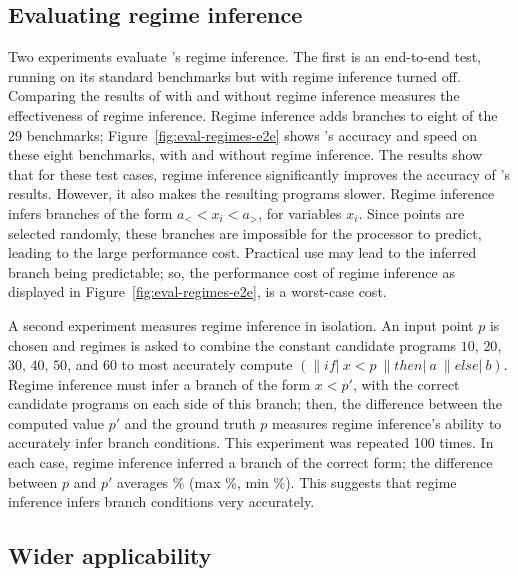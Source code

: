 \documentclass[paper.tex]{subfiles}
\begin{document}
\subsection{Evaluating regime inference} \label{sec:eval-regimes}

Two experiments evaluate \casio's regime inference.
The first is an end-to-end test,
  running \casio on its standard benchmarks but with regime inference turned off.
Comparing the results of \casio with and without regime inference
  measures the effectiveness of regime inference.
Regime inference adds branches to eight of the 29 benchmarks;
  Figure~\ref{fig:eval-regimes-e2e} shows
  \casio's accuracy and speed on these eight benchmarks,
  with and without regime inference.
The results show that for these test cases, regime inference
  significantly improves the accuracy of \casio's results.
However, it also makes the resulting programs slower.
Regime inference infers branches of the form $a_< < x_i < a_>$,
  for variables $x_i$.
Since points are selected randomly, these branches are
  impossible for the processor to predict,
  leading to the large performance cost.
Practical use may lead to the inferred branch being predictable;
  so, the performance cost of regime inference
  as displayed in Figure~\ref{fig:eval-regimes-e2e},
  is a worst-case cost.

A second experiment measures regime inference in isolation.
An input point $p$ is chosen
  and regimes is asked to combine the constant candidate programs
  $10$, $20$, $30$, $40$, $50$, and $60$
  to most accurately compute $(\|if|\:x < p\:\|then|\:a\:\|else|\:b)$.
Regime inference must infer a branch of the form $x < p'$,
  with the correct candidate programs on each side of this branch;
  then, the difference between the computed value $p'$ and the ground truth $p$
  measures regime inference's ability to accurately infer branch conditions.
This experiment was repeated 100 times.
In each case, regime inference inferred a branch of the correct form;
  the difference between $p$ and $p'$ averages \%
  (max \%, min \%).
This suggests that regime inference infers branch conditions
  very accurately.

\subsection{Wider applicability}
\end{document}
